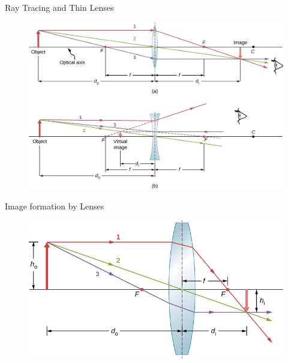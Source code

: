 \documentclass{beamer}
\begin{document}
\begin{frame}{Ray Tracing and Thin Lenses}
	\begin{figure}
		\centering 
		\includegraphics[scale=0.3]{58.png}
	\end{figure}
\end{frame}

\begin{frame}{Image formation by Lenses}
	\begin{figure}
		\centering
		\includegraphics[scale=0.8]{59.jpg}
	\end{figure}
\end{frame}
\end{document}
